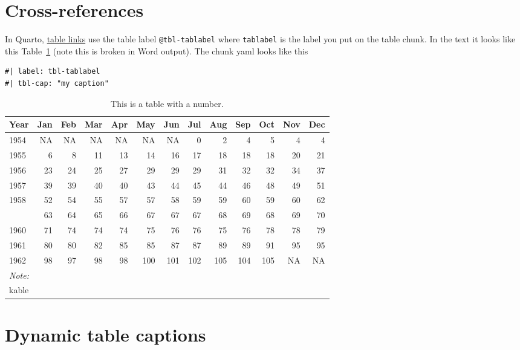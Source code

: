 \documentclass[
  letterpaper,
  oneside]{scrbook}
\begin{document}
\hypertarget{cross-references-1}{%
\section{Cross-references}\label{cross-references-1}}

In Quarto,
\href{https://quarto.org/docs/authoring/cross-references.html\#tables}{table
links} use the table label \texttt{@tbl-tablabel} where
\texttt{tablabel} is the label you put on the table chunk. In the text
it looks like this Table~\ref{tbl-tablabel} (note this is broken in Word
output). The chunk yaml looks like this

\begin{verbatim}
#| label: tbl-tablabel
#| tbl-cap: "my caption"
\end{verbatim}

\hypertarget{tbl-tablabel}{}
\begin{table}
\caption{\label{tbl-tablabel}This is a table with a number. }\tabularnewline

\centering
\begin{tabular}[t]{lrrrrrrrrrrrr}
\toprule
Year & Jan & Feb & Mar & Apr & May & Jun & Jul & Aug & Sep & Oct & Nov & Dec\\
\midrule
1954 & NA & NA & NA & NA & NA & NA & 0 & 2 & 4 & 5 & 4 & 4\\
1955 & 6 & 8 & 11 & 13 & 14 & 16 & 17 & 18 & 18 & 18 & 20 & 21\\
1956 & 23 & 24 & 25 & 27 & 29 & 29 & 29 & 31 & 32 & 32 & 34 & 37\\
1957 & 39 & 39 & 40 & 40 & 43 & 44 & 45 & 44 & 46 & 48 & 49 & 51\\
1958 & 52 & 54 & 55 & 57 & 57 & 58 & 59 & 59 & 60 & 59 & 60 & 62\\
\addlinespace
1959 & 63 & 64 & 65 & 66 & 67 & 67 & 67 & 68 & 69 & 68 & 69 & 70\\
1960 & 71 & 74 & 74 & 74 & 75 & 76 & 76 & 75 & 76 & 78 & 78 & 79\\
1961 & 80 & 80 & 82 & 85 & 85 & 87 & 87 & 89 & 89 & 91 & 95 & 95\\
1962 & 98 & 97 & 98 & 98 & 100 & 101 & 102 & 105 & 104 & 105 & NA & NA\\
\bottomrule
\multicolumn{13}{l}{\rule{0pt}{1em}\textit{Note: }}\\
\multicolumn{13}{l}{\rule{0pt}{1em}kable}\\
\end{tabular}
\end{table}

\hypertarget{dynamic-table-captions}{%
\section{Dynamic table captions}\label{dynamic-table-captions}}
\end{document}
